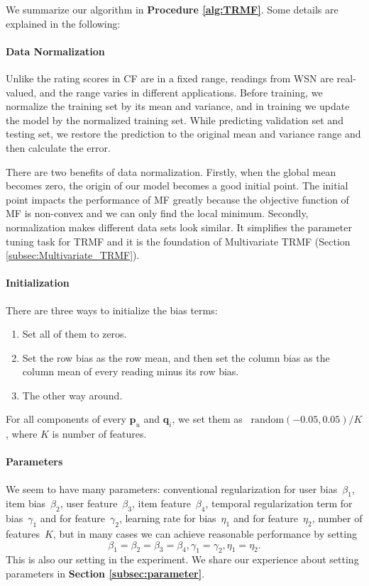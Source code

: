 We summarize our algorithm in \textbf{Procedure \ref{alg:TRMF}}. Some details are explained in the following:

\paragraph*{Data Normalization}

Unlike the rating scores in CF are in a fixed range, readings from WSN are real-valued, and the range varies in different applications. Before training, we normalize the training set by its mean and variance, and in training we update the model by the normalized training set. While predicting validation set and testing set, we restore the prediction to the original mean and variance range and then calculate the error.

There are two benefits of data normalization. Firstly, when the global mean becomes zero, the origin of our model becomes a good initial point. The initial point impacts the performance of MF greatly because the objective function of MF is non-convex and we can only find the local minimum. Secondly, normalization makes different data sets look similar. It simplifies the parameter tuning task for TRMF and it is the foundation of Multivariate TRMF (Section \ref{subsec:Multivariate_TRMF}). 


\paragraph*{Initialization}

There are three ways to initialize the bias terms:
\begin{enumerate}
	\setlength {\itemsep}{-5pt}
	\item Set all of them to zeros.
	\item Set the row bias as the row mean, and then set the column bias as the column mean of every reading minus its row bias.
	\item The other way around.
\end{enumerate}
For all components of every $\mathbf{p}_{u}$ and $\mathbf{q}_{i}$, we set them as ~$\mbox{random}(-0.05,0.05)/K$, where $K$ is number of features.

\paragraph*{Parameters}

We seem to have many parameters: conventional regularization for user bias~$\beta_1$, item bias~$\beta_2$, user feature~$\beta_3$, item feature~$\beta_4$, temporal regularization term for bias~$\gamma_1$ and for feature~$\gamma_2$, learning rate for bias~$\eta_1$ and for feature~$\eta_2$, number of features~$K$, but in many cases we can achieve reasonable performance by setting 
\begin{equation*}\beta_1 = \beta_2 = \beta_3 = \beta_4, \gamma_1 = \gamma_2, \eta_1 = \eta_2. \end{equation*}
This is also our setting in the experiment. We share our experience about setting parameters in \textbf{Section \ref{subsec:parameter}}.

